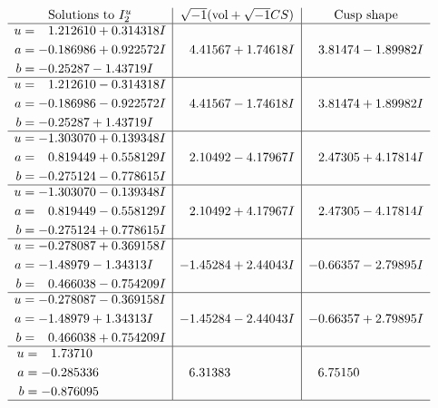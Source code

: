 \documentclass[1p]{elsarticle_modified}
\theoremstyle{definition}
\newcommand{\I}{\sqrt{-1}}
\begin{document}
$$\begin{array}{c|c|c}  
\text{Solutions to }I^u_{2}& \I (\text{vol} + \sqrt{-1}CS) & \text{Cusp shape}\\
 \hline 
\begin{aligned}
u &= \phantom{-}1.212610 + 0.314318 I \\
a &= -0.186986 + 0.922572 I \\
b &= -0.25287 - 1.43719 I\end{aligned}
 & \phantom{-}4.41567 + 1.74618 I & \phantom{-}3.81474 - 1.89982 I \\ \hline\begin{aligned}
u &= \phantom{-}1.212610 - 0.314318 I \\
a &= -0.186986 - 0.922572 I \\
b &= -0.25287 + 1.43719 I\end{aligned}
 & \phantom{-}4.41567 - 1.74618 I & \phantom{-}3.81474 + 1.89982 I \\ \hline\begin{aligned}
u &= -1.303070 + 0.139348 I \\
a &= \phantom{-}0.819449 + 0.558129 I \\
b &= -0.275124 - 0.778615 I\end{aligned}
 & \phantom{-}2.10492 - 4.17967 I & \phantom{-}2.47305 + 4.17814 I \\ \hline\begin{aligned}
u &= -1.303070 - 0.139348 I \\
a &= \phantom{-}0.819449 - 0.558129 I \\
b &= -0.275124 + 0.778615 I\end{aligned}
 & \phantom{-}2.10492 + 4.17967 I & \phantom{-}2.47305 - 4.17814 I \\ \hline\begin{aligned}
u &= -0.278087 + 0.369158 I \\
a &= -1.48979 - 1.34313 I \\
b &= \phantom{-}0.466038 - 0.754209 I\end{aligned}
 & -1.45284 + 2.44043 I & -0.66357 - 2.79895 I \\ \hline\begin{aligned}
u &= -0.278087 - 0.369158 I \\
a &= -1.48979 + 1.34313 I \\
b &= \phantom{-}0.466038 + 0.754209 I\end{aligned}
 & -1.45284 - 2.44043 I & -0.66357 + 2.79895 I \\ \hline\begin{aligned}
u &= \phantom{-}1.73710\phantom{ +0.000000I} \\
a &= -0.285336\phantom{ +0.000000I} \\
b &= -0.876095\phantom{ +0.000000I}\end{aligned}
 & \phantom{-}6.31383\phantom{ +0.000000I} & \phantom{-}6.75150\phantom{ +0.000000I}\\
 \hline 
 \end{array}$$\newpage\newpage\renewcommand{\arraystretch}{1}
\end{document}
